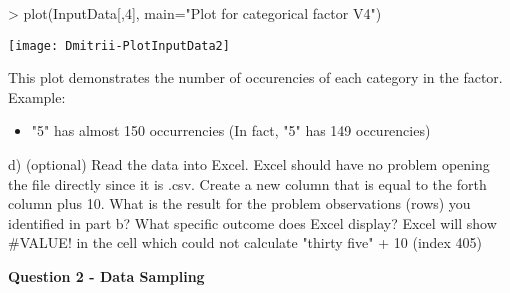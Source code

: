 \documentclass[12pt]{article}
\begin{document}
\newpage
\begin{Schunk}
\begin{Sinput}
> plot(InputData[,4], main="Plot for categorical factor V4")
\end{Sinput}
\end{Schunk}
\texttt{[image: Dmitrii-PlotInputData2]}

This plot demonstrates the number of occurencies of each category in the factor.
Example: 
\begin{itemize}
\item {"5" has almost 150 occurrencies (In fact, "5" has 149 occurencies)}
\end{itemize}

\newpage
d) (optional) Read the data into Excel. Excel should have no problem opening the file
directly since it is .csv. Create a new column that is equal to the forth column plus 10.
What is the result for the problem observations (rows) you identified in part b? What
specific outcome does Excel display?
\tabularnewline
Excel will show \#VALUE! in the cell which could not calculate "thirty five" + 10 (index 405)
\newpage

\begin{center}
{\bf\Large Question 2 - Data Sampling}
\linebreak
\end{center}
\end{document}
